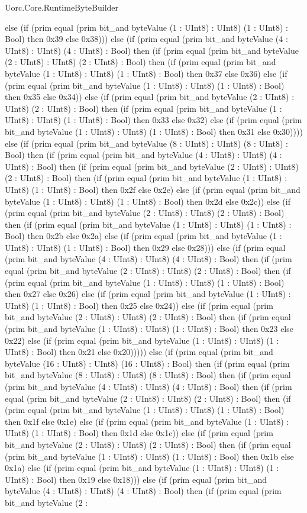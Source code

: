 \begin{lexlean}{Uorc.Core.RuntimeByteBuilder}
\begin{semanticmodule}
{else (if (prim equal (prim bit_and byteValue (1 : UInt8) : UInt8) (1 : UInt8) : Bool) then 0x39 else 0x38))) else (if (prim equal (prim bit_and byteValue (4 : UInt8) : UInt8) (4 : UInt8) : Bool) then (if (prim equal (prim bit_and byteValue (2 : UInt8) : UInt8) (2 : UInt8) : Bool) then (if (prim equal (prim bit_and byteValue (1 : UInt8) : UInt8) (1 : UInt8) : Bool) then 0x37 else 0x36) else (if (prim equal (prim bit_and byteValue (1 : UInt8) : UInt8) (1 : UInt8) : Bool) then 0x35 else 0x34)) else (if (prim equal (prim bit_and byteValue (2 : UInt8) : UInt8) (2 : UInt8) : Bool) then (if (prim equal (prim bit_and byteValue (1 : UInt8) : UInt8) (1 : UInt8) : Bool) then 0x33 else 0x32) else (if (prim equal (prim bit_and byteValue (1 : UInt8) : UInt8) (1 : UInt8) : Bool) then 0x31 else 0x30)))) else (if (prim equal (prim bit_and byteValue (8 : UInt8) : UInt8) (8 : UInt8) : Bool) then (if (prim equal (prim bit_and byteValue (4 : UInt8) : UInt8) (4 : UInt8) : Bool) then (if (prim equal (prim bit_and byteValue (2 : UInt8) : UInt8) (2 : UInt8) : Bool) then (if (prim equal (prim bit_and byteValue (1 : UInt8) : UInt8) (1 : UInt8) : Bool) then 0x2f else 0x2e) else (if (prim equal (prim bit_and byteValue (1 : UInt8) : UInt8) (1 : UInt8) : Bool) then 0x2d else 0x2c)) else (if (prim equal (prim bit_and byteValue (2 : UInt8) : UInt8) (2 : UInt8) : Bool) then (if (prim equal (prim bit_and byteValue (1 : UInt8) : UInt8) (1 : UInt8) : Bool) then 0x2b else 0x2a) else (if (prim equal (prim bit_and byteValue (1 : UInt8) : UInt8) (1 : UInt8) : Bool) then 0x29 else 0x28))) else (if (prim equal (prim bit_and byteValue (4 : UInt8) : UInt8) (4 : UInt8) : Bool) then (if (prim equal (prim bit_and byteValue (2 : UInt8) : UInt8) (2 : UInt8) : Bool) then (if (prim equal (prim bit_and byteValue (1 : UInt8) : UInt8) (1 : UInt8) : Bool) then 0x27 else 0x26) else (if (prim equal (prim bit_and byteValue (1 : UInt8) : UInt8) (1 : UInt8) : Bool) then 0x25 else 0x24)) else (if (prim equal (prim bit_and byteValue (2 : UInt8) : UInt8) (2 : UInt8) : Bool) then (if (prim equal (prim bit_and byteValue (1 : UInt8) : UInt8) (1 : UInt8) : Bool) then 0x23 else 0x22) else (if (prim equal (prim bit_and byteValue (1 : UInt8) : UInt8) (1 : UInt8) : Bool) then 0x21 else 0x20))))) else (if (prim equal (prim bit_and byteValue (16 : UInt8) : UInt8) (16 : UInt8) : Bool) then (if (prim equal (prim bit_and byteValue (8 : UInt8) : UInt8) (8 : UInt8) : Bool) then (if (prim equal (prim bit_and byteValue (4 : UInt8) : UInt8) (4 : UInt8) : Bool) then (if (prim equal (prim bit_and byteValue (2 : UInt8) : UInt8) (2 : UInt8) : Bool) then (if (prim equal (prim bit_and byteValue (1 : UInt8) : UInt8) (1 : UInt8) : Bool) then 0x1f else 0x1e) else (if (prim equal (prim bit_and byteValue (1 : UInt8) : UInt8) (1 : UInt8) : Bool) then 0x1d else 0x1c)) else (if (prim equal (prim bit_and byteValue (2 : UInt8) : UInt8) (2 : UInt8) : Bool) then (if (prim equal (prim bit_and byteValue (1 : UInt8) : UInt8) (1 : UInt8) : Bool) then 0x1b else 0x1a) else (if (prim equal (prim bit_and byteValue (1 : UInt8) : UInt8) (1 : UInt8) : Bool) then 0x19 else 0x18))) else (if (prim equal (prim bit_and byteValue (4 : UInt8) : UInt8) (4 : UInt8) : Bool) then (if (prim equal (prim bit_and byteValue (2 : }
\end{semanticmodule}
\end{lexlean}
